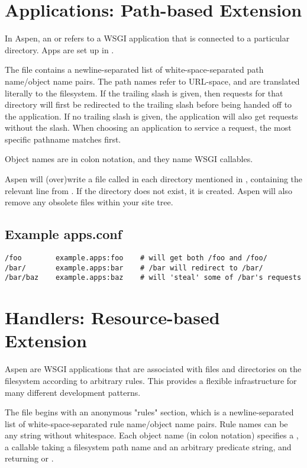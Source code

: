 \section{Applications: Path-based Extension \label{apps}}

In Aspen, an  or  refers to a WSGI application that is
connected to a particular directory. Apps are set up in .

The  file contains a newline-separated list of
white-space-separated path name/object name pairs. The path names refer to
URL-space, and are translated literally to the filesystem. If the trailing slash
is given, then requests for that directory will first be redirected to the
trailing slash before being handed off to the application. If no trailing slash
is given, the application will also get requests without the slash. When
choosing an application to service a request, the most specific pathname matches
first.

Object names are in colon notation, and they name WSGI callables.

Aspen will (over)write a file called  in each directory
mentioned in , containing the relevant line from
. If the directory does not exist, it is created. Aspen will
also remove any obsolete  files within your site tree.


\subsection{Example apps.conf}

\begin{verbatim}
/foo        example.apps:foo    # will get both /foo and /foo/
/bar/       example.apps:bar    # /bar will redirect to /bar/
/bar/baz    example.apps:baz    # will 'steal' some of /bar's requests
\end{verbatim}


\section{Handlers: Resource-based Extension \label{handlers}}

Aspen  are WSGI applications that are associated with files and
directories on the filesystem according to arbitrary rules. This provides a
flexible infrastructure for many different development patterns.

The  file begins with an anonymous "rules" section,
which is a newline-separated list of white-space-separated rule name/object name
pairs. Rule names can be any string without whitespace. Each object name (in
colon notation) specifies a , a callable taking a filesystem path name
and an arbitrary predicate string, and returning  or .


